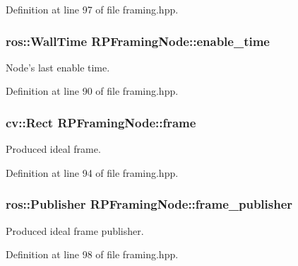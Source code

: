 \-Definition at line 97 of file framing.\-hpp.

\hypertarget{class_r_p_framing_node_ac14e461ed967dd726303ff86c7f065e2}{
\subsubsection[{enable\-\_\-time}]{\setlength{\rightskip}{0pt plus 5cm}ros\-::\-Wall\-Time {\bf \-R\-P\-Framing\-Node\-::enable\-\_\-time}}}\label{class_r_p_framing_node_ac14e461ed967dd726303ff86c7f065e2}
\-Node's last enable time. 

\-Definition at line 90 of file framing.\-hpp.

\hypertarget{class_r_p_framing_node_a1e4cba34d01b81db86ae54435d98ec76}{
\subsubsection[{frame}]{\setlength{\rightskip}{0pt plus 5cm}cv\-::\-Rect {\bf \-R\-P\-Framing\-Node\-::frame}}}\label{class_r_p_framing_node_a1e4cba34d01b81db86ae54435d98ec76}
\-Produced ideal frame. 

\-Definition at line 94 of file framing.\-hpp.

\hypertarget{class_r_p_framing_node_ae72d8d6735b444261bcb202f928404cc}{
\subsubsection[{frame\-\_\-publisher}]{\setlength{\rightskip}{0pt plus 5cm}ros\-::\-Publisher {\bf \-R\-P\-Framing\-Node\-::frame\-\_\-publisher}}}\label{class_r_p_framing_node_ae72d8d6735b444261bcb202f928404cc}
\-Produced ideal frame publisher. 

\-Definition at line 98 of file framing.\-hpp.

